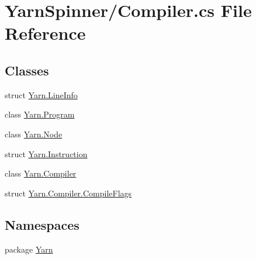 \hypertarget{a00264}{\section{Yarn\-Spinner/\-Compiler.cs File Reference}
\label{a00264}
}
\subsection*{Classes}
\begin{DoxyCompactItemize}
\item 
struct \hyperlink{a00105}{Yarn.\-Line\-Info}
\item 
class \hyperlink{a00126}{Yarn.\-Program}
\item 
class \hyperlink{a00031_dd/de2/a00320}{Yarn.\-Node}
\item 
struct \hyperlink{a00095}{Yarn.\-Instruction}
\item 
class \hyperlink{a00034}{Yarn.\-Compiler}
\item 
struct \hyperlink{a00034_d3/db8/a00316}{Yarn.\-Compiler.\-Compile\-Flags}
\end{DoxyCompactItemize}
\subsection*{Namespaces}
\begin{DoxyCompactItemize}
\item 
package \hyperlink{a00031}{Yarn}
\end{DoxyCompactItemize}

